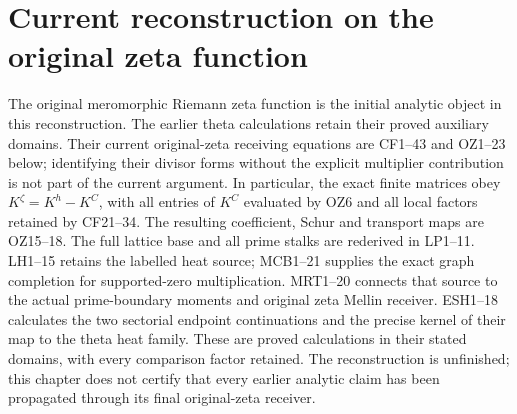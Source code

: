 \section*{Current reconstruction on the original zeta function}
The original meromorphic Riemann zeta function is the initial
analytic object in this reconstruction. The earlier theta calculations
retain their proved auxiliary domains. Their current original-zeta
receiving equations are CF1--43 and OZ1--23 below; identifying their
divisor forms without the explicit multiplier contribution is not
part of the current argument. In particular, the exact finite matrices
obey \(K^\zeta=K^h-K^C\), with all entries of \(K^C\) evaluated
by OZ6 and all local factors retained by CF21--34. The resulting
coefficient, Schur and transport maps are OZ15--18.
The full lattice base and all prime stalks are rederived in LP1--11.
LH1--15 retains the labelled heat source; MCB1--21 supplies the
exact graph completion for supported-zero multiplication.
MRT1--20 connects that source to the actual prime-boundary moments
and original zeta Mellin receiver. ESH1--18 calculates the two
sectorial endpoint continuations and the precise kernel of their
map to the theta heat family. These are proved calculations in
their stated domains, with every comparison factor retained.
The reconstruction is unfinished; this chapter does not certify that
every earlier analytic claim has been propagated through its final
original-zeta receiver.
















